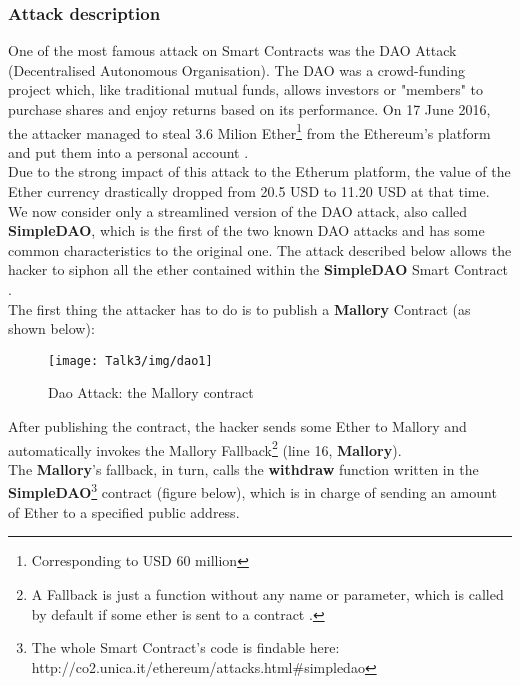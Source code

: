 \subsubsection{Attack description}
One of the most famous attack on Smart Contracts was the DAO Attack (Decentralised Autonomous Organisation)\cite{SC6}.
The DAO was a crowd-funding project which, like traditional mutual funds, allows investors or "members" to purchase shares and enjoy returns based on its performance.
On 17 June 2016, the attacker managed to steal 3.6 Milion Ether\footnote{Corresponding to USD 60 million} from the Ethereum's platform and put them into a personal account \cite{SC8}.\\ %
Due to the strong impact of this attack to the Etherum platform, the value of the Ether currency drastically dropped from 20.5 USD to 11.20 USD at that time\cite{SC9}.  
\\
We now consider only a streamlined version of the DAO attack, also called \textbf{SimpleDAO}, which is the first of the two known DAO attacks and has some common characteristics to the original one. The attack described below allows the hacker to siphon all the ether contained within the \textbf{SimpleDAO} Smart Contract \cite{paper2}. \\
The first thing the attacker has to do is to publish a \textbf{Mallory} Contract (as shown below): 
\begin{figure}[H]
\begin{center}
\texttt{[image: Talk3/img/dao1]}
\end{center}
\caption{Dao Attack: the Mallory contract}
\label{label}
\end{figure}
After publishing the contract, the hacker sends some Ether to Mallory and automatically invokes the Mallory Fallback\footnote{A Fallback is just a function without any name or parameter, which is called by default if some ether is sent to a contract \cite{SC10}. } (line 16, \textbf{Mallory}). \\
The \textbf{Mallory}'s fallback, in turn, calls the \textbf{withdraw} function written in the \textbf{SimpleDAO}\footnote{The whole Smart Contract's code is findable here: http://co2.unica.it/ethereum/attacks.html\#simpledao} contract (figure below), which is in charge of sending an amount of Ether to a specified public address. 
